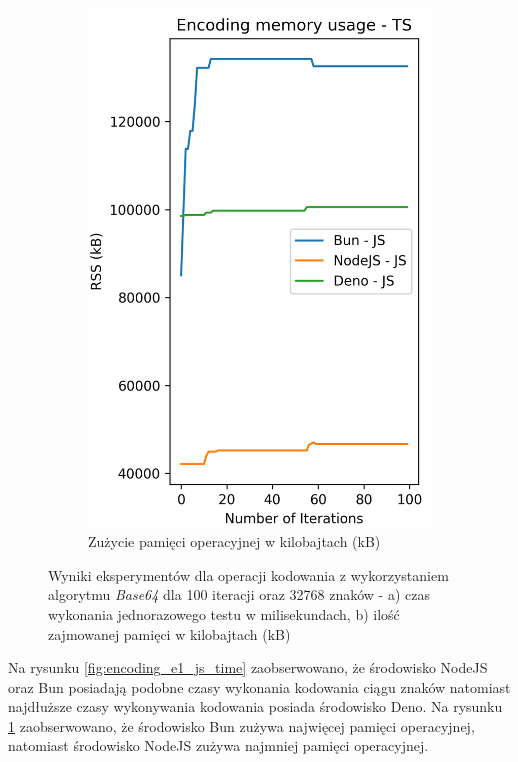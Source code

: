 \begin{figure}[H]
\begin{subfigure}[b]{0.44\textwidth}
    \includegraphics[width=\textwidth]{Figures/coding/base64_100_encoding_js_memory.png}
    \caption{Zużycie pamięci operacyjnej w kilobajtach (kB)}
    \label{fig:encoding_e1_js_memory}
  \end{subfigure}
  \hfill
  \caption{Wyniki eksperymentów dla operacji kodowania z wykorzystaniem algorytmu \textit{Base64} dla 100 iteracji oraz 32768 znaków - a) czas wykonania jednorazowego testu w milisekundach, b) ilość zajmowanej pamięci w kilobajtach (kB)}
  \label{fig:encoding_e1_js}
\end{figure}

Na rysunku \ref{fig:encoding_e1_js_time} zaobserwowano, że środowisko NodeJS oraz Bun posiadają podobne czasy wykonania kodowania ciągu znaków natomiast najdłuższe czasy wykonywania kodowania posiada środowisko Deno. Na rysunku \ref{fig:encoding_e1_js_memory} zaobserwowano, że środowisko Bun zużywa najwięcej pamięci operacyjnej, natomiast środowisko NodeJS zużywa najmniej pamięci operacyjnej.

